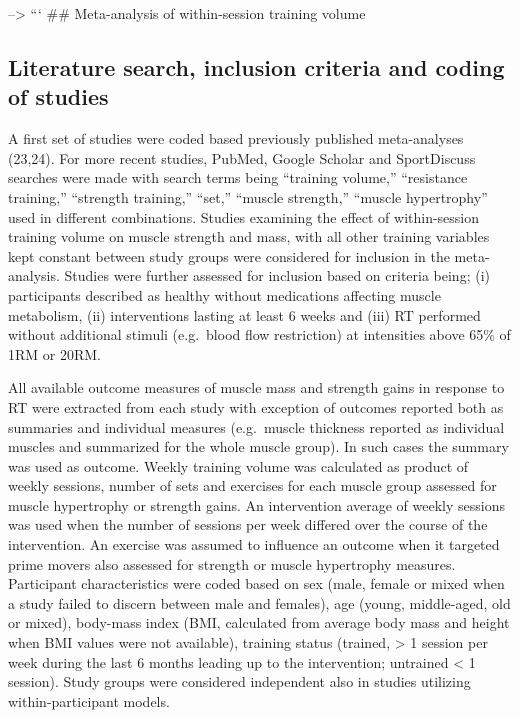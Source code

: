 \documentclass[twoside,10pt]{gihclass} %
\begin{document}
--\textgreater{} ``` \#\# Meta-analysis of within-session training volume

\hypertarget{literature-search-inclusion-criteria-and-coding-of-studies}{%
\subsection{Literature search, inclusion criteria and coding of studies}\label{literature-search-inclusion-criteria-and-coding-of-studies}}

A first set of studies were coded based previously published
meta-analyses (23,24). For more recent studies, PubMed, Google
Scholar and SportDiscuss searches were made with search terms being
``training volume,'' ``resistance training,'' ``strength training,'' ``set,''
``muscle strength,'' ``muscle hypertrophy'' used in different combinations.
Studies examining the effect of within-session training volume on muscle
strength and mass, with all other training variables kept constant
between study groups were considered for inclusion in the meta-analysis.
Studies were further assessed for inclusion based on criteria being; (i)
participants described as healthy without medications affecting muscle
metabolism, (ii) interventions lasting at least 6 weeks and (iii) RT
performed without additional stimuli (e.g.~blood flow restriction) at
intensities above 65\% of 1RM or 20RM.

All available outcome measures of muscle mass and strength gains in
response to RT were extracted from each study with exception of outcomes
reported both as summaries and individual measures (e.g.~muscle
thickness reported as individual muscles and summarized for the whole
muscle group). In such cases the summary was used as outcome. Weekly
training volume was calculated as product of weekly sessions, number of
sets and exercises for each muscle group assessed for muscle hypertrophy
or strength gains. An intervention average of weekly sessions was used
when the number of sessions per week differed over the course of the
intervention. An exercise was assumed to influence an outcome when it
targeted prime movers also assessed for strength or muscle hypertrophy
measures. Participant characteristics were coded based on sex (male,
female or mixed when a study failed to discern between male and
females), age (young, middle-aged, old or mixed), body-mass index (BMI,
calculated from average body mass and height when BMI values were not
available), training status (trained, \textgreater{} 1 session per week during the
last 6 months leading up to the intervention; untrained \textless{} 1 session).
Study groups were considered independent also in studies utilizing
within-participant models.
\end{document}
